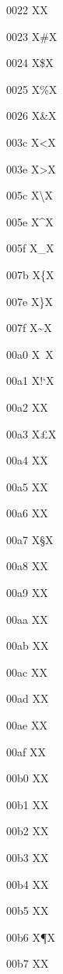 \documentclass[11pt]{article}
\begin{document}
\renewcommand{\|}{} %
\newcommand{\B}{} %
\newcommand{\G}{} %
\newcommand{\U}{} %
\newcommand{\h}{} %
\newcommand{\OHORN}{} %
\newcommand{\ohorn}{} %
\newcommand{\UHORN}{} %
\newcommand{\uhorn}{} %
\newcommand{\textsubbreve}{} %
\newcommand{\cb}{} %
0022 X{\textquotedbl}X

0023 X{\#}X

0024 X{\$}X

0025 X{\%}X

0026 X{\&}X

003c X{\textless}X

003e X{\textgreater}X

005c X{\textbackslash}X

005e X{\^{}}X

005f X{\_}X

007b X{\{}X

007e X{\}}X

007f X{\~{}}X

00a0 X{~}X

00a1 X{!`}X

00a2 X{\textcent}X

00a3 X{\pounds}X

00a4 X{\textcurrency}X

00a5 X{\textyen}X

00a6 X{\textbrokenbar}X

00a7 X{\S}X

00a8 X{\textasciidieresis}X

00a9 X{\textcopyright}X

00aa X{\textordfeminine}X

00ab X{\guillemotleft}X

00ac X{\textlnot}X

00ad X{\-}X

00ae X{\textregistered}X

00af X{\textasciimacron}X

00b0 X{\textdegree}X

00b1 X{\textpm}X

00b2 X{\texttwosuperior}X

00b3 X{\textthreesuperior}X

00b4 X{\textasciiacute}X

00b5 X{\textmu}X

00b6 X{\P}X

00b7 X{\textperiodcentered}X
\end{document}
